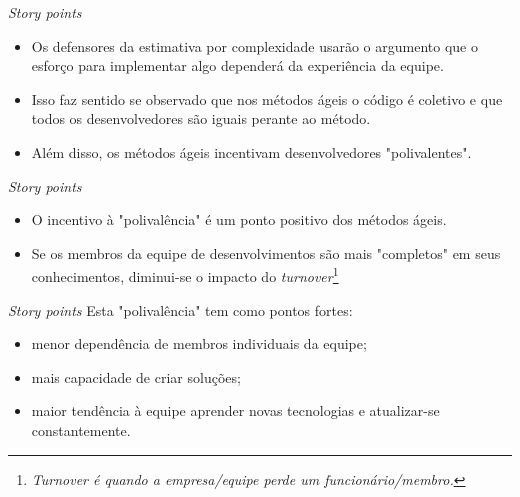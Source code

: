 \documentclass[11pt]{beamer}
\begin{document}
    \begin{frame}{\textit{Story points}}
        \begin{itemize}
            \item Os defensores da estimativa por complexidade usarão o argumento que o esforço para implementar algo dependerá da experiência da equipe.
            \item Isso faz sentido se observado que nos métodos ágeis o código é coletivo e que todos os desenvolvedores são iguais perante ao método.
            \item Além disso, os métodos ágeis incentivam desenvolvedores "polivalentes".
        \end{itemize}
    \end{frame}

    \begin{frame}{\textit{Story points}}
        \begin{itemize}
            \item O incentivo à "polivalência" é um ponto positivo dos métodos ágeis.
            \item Se os membros da equipe de desenvolvimentos são mais "completos" em seus conhecimentos, diminui-se o impacto do \textit{turnover}\footnote{\textit{Turnover é quando a empresa/equipe perde um funcionário/membro.}}
        \end{itemize}
    \end{frame}

    \begin{frame}{\textit{Story points}}
        Esta "polivalência" tem como pontos fortes:
        \begin{itemize}
            \item menor dependência de membros individuais da equipe;
            \item mais capacidade de criar soluções;
            \item maior tendência à equipe aprender novas tecnologias e atualizar-se constantemente.
        \end{itemize}
    \end{frame}
\end{document}
